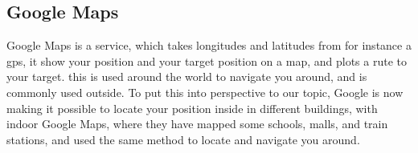 
\subsection{Google Maps}
Google Maps is a service, which takes longitudes and latitudes from for instance a gps, it show your position and your target position on a map, and plots a rute to your target. this is used around the world to navigate you around, and is commonly used outside. To put this into perspective to our topic, Google is now making it possible to locate your position inside in different buildings, with indoor Google Maps, where they have mapped some schools, malls, and train stations, and used the same method to locate and navigate you around.






